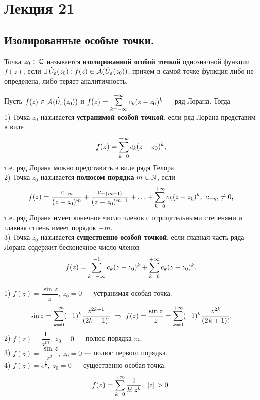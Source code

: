 	\section{Лекция 21}
	\subsection{Изолированные особые точки.}
	\begin{definition}
		Точка $z_0\in\mathbb{C}$ называется \textbf{изолированной особой точкой} однозначной функции $f(z)$, если $\exists\,\dot U_\varepsilon(z_0): f(z)\in\mathcal{A}(\dot U_\varepsilon(z_0))$, причем в самой точке функция либо не определена, либо теряет аналитичность.
	\end{definition}
	\begin{definition}
		Пусть $f(z)\in\mathcal{A}(\dot U_\varepsilon(z_0))$ и $f(z) = \sum\limits_{k =-\infty}^{+\infty}c_k(z-z_0)^k$ --- ряд Лорана. Тогда\\
		1) Точка $z_0$ называется \textbf{устранимой особой точкой}, если ряд Лорана представим в виде\[ f(z)=\sum\limits_{k=0}^{+\infty}c_k(z-z_0)^k, \]
		т.е. ряд Лорана можно представить в виде рядя Телора.\\
		2) Точка $z_0$ называется \textbf{полюсом порядка} $m\in\mathbb{N}$, если 
		\[ f(z) = \frac{c_{-m}}{(z-z_0)^m} + \frac{c_{-( m-1)}}{(z-z_0)^{m-1}} + \ldots + \Sum_{k=0}^{+\infty}c_k(z-z_0)^k,\ c_{-m}\ne 0, \]
		т.е. ряд Лорана имеет конечное число членов с отрицательными степенями и главная стпень имеет порядок $-m$.\\
		3) Точка $z_0$ называется \textbf{существенно особой точкой}, если главная часть ряда Лорана содержит бесконечное число членов
		\[ f(z) = \sum\limits_{k=-\infty}^{-1} c_k(z-z_0)^k + \sum\limits_{k=0}^{+\infty} c_k(z-z_0)^k. \]
	\end{definition}
	\begin{example}
		\hspace{-0.94cm}
		1) $f(z) = \dfrac{\sin z}{z},\ z_0 = 0$ --- устранимая особая точка.\\
		\[ \sin z = \sum\limits_{k=0}^{+\infty}(-1)^k\frac{z^{2k+1}}{(2k+1)!} \;\Rightarrow\; f(z) = \frac{\sin z}{z} = \sum\limits_{k=0}^{+\infty}(-1)^k\frac{z^{2k}}{(2k+1)!}. \]
		2) $f(z) = \dfrac{1}{z^m},\ z_0 = 0$ --- полюс порядка $m$.\\[2mm]
		3) $f(z) = \dfrac{\sin z}{z^2},\ z_0 = 0$ --- полюс первого порядка.\\[2mm]
		4) $f(z) = e^{\frac{1}{z}},\ z_0 = 0$ --- существенно особая точка.
		\[ f(z) = \sum\limits_{k=0}^{+\infty}\frac{1}{k!\,z^k},\ |z| > 0.\] 
	\end{example}
